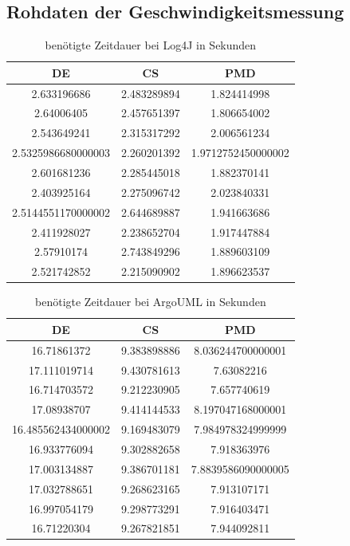 \begin{appendices}
\chapter{Rohdaten der Geschwindigkeitsmessung}\label{chapter:raw_speed_data}
\begin{table}[]
    \centering
    \begin{tabular}{c|c|c}
DE & CS &PMD\\\hline
2.633196686&2.483289894&1.824414998 \\\hline
2.64006405&2.457651397&1.806654002 \\\hline
2.543649241&2.315317292&2.006561234 \\\hline
2.5325986680000003&2.260201392&1.9712752450000002 \\\hline
2.601681236&2.285445018&1.882370141 \\\hline
2.403925164&2.275096742&2.023840331 \\\hline
2.5144551170000002&2.644689887&1.941663686 \\\hline
2.411928027&2.238652704&1.917447884 \\\hline
2.57910174&2.743849296&1.889603109 \\\hline
2.521742852&2.215090902&1.896623537 \\\hline
    \end{tabular}
    \caption{benötigte Zeitdauer bei Log4J in Sekunden}
    \label{tab:raw_log4j}
\end{table}


\begin{table}[]
    \centering
    \begin{tabular}{c|c|c}
DE & CS &PMD\\\hline
16.71861372&9.383898886&8.036244700000001 \\\hline
17.111019714&9.430781613&7.63082216 \\\hline
16.714703572&9.212230905&7.657740619 \\\hline
17.08938707&9.414144533&8.197047168000001 \\\hline
16.485562434000002&9.169483079&7.984978324999999 \\\hline
16.933776094&9.302882658&7.918363976 \\\hline
17.003134887&9.386701181&7.8839586090000005 \\\hline
17.032788651&9.268623165&7.913107171 \\\hline
16.997054179&9.298773291&7.916403471 \\\hline
16.71220304&9.267821851&7.944092811 \\\hline
    \end{tabular}
    \caption{benötigte Zeitdauer bei ArgoUML in Sekunden}
    \label{tab:raw_argo}
\end{table}



\end{appendices}

